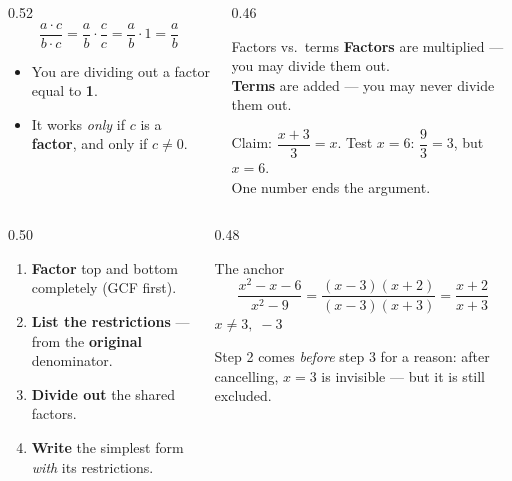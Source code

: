 \documentclass[aspectratio=169, 11pt]{beamer}
\begin{document}
\begin{frame}[t, plain]
  \begin{columns}[T]
    \begin{column}{0.52\textwidth}
      \[ \frac{a\cdot c}{b\cdot c}=\frac{a}{b}\cdot\frac{c}{c}=\frac{a}{b}\cdot 1=\frac{a}{b} \]
      \begin{itemize}\setlength{\itemsep}{4pt}
        \item You are dividing out a factor equal to \textbf{1}.
        \item It works \emph{only} if $c$ is a \textbf{factor}, and only if $c\neq0$.
      \end{itemize}
    \end{column}
    \begin{column}{0.46\textwidth}
      \begin{block}{Factors vs.\ terms}
        \textbf{Factors} are multiplied --- you may divide them out. \\[3pt]
        \textbf{Terms} are added --- you may never divide them out.
      \end{block}
      \vspace{3pt}
      {\footnotesize Claim: $\dfrac{x+3}{3}=x$. \; Test $x=6$: \; $\dfrac{9}{3}=3$, but $x=6$.
      \\[3pt] One number ends the argument.}
    \end{column}
  \end{columns}
\end{frame}

\begin{frame}[t, plain]
  \begin{columns}[T]
    \begin{column}{0.50\textwidth}
      \begin{enumerate}\setlength{\itemsep}{5pt}
        \item \textbf{Factor} top and bottom completely (GCF first).
        \item \textbf{List the restrictions} --- from the \textbf{original} denominator.
        \item \textbf{Divide out} the shared factors.
        \item \textbf{Write} the simplest form \emph{with} its restrictions.
      \end{enumerate}
    \end{column}
    \begin{column}{0.48\textwidth}
      \begin{block}{The anchor}
        \[ \frac{x^2-x-6}{x^2-9}=\frac{(x-3)(x+2)}{(x-3)(x+3)}=\frac{x+2}{x+3} \]
        \centering $x\neq 3,\;-3$
      \end{block}
      \vspace{3pt}
      {\footnotesize Step 2 comes \emph{before} step 3 for a reason: after cancelling, $x=3$ is
      invisible --- but it is still excluded.}
    \end{column}
  \end{columns}
\end{frame}
\end{document}
